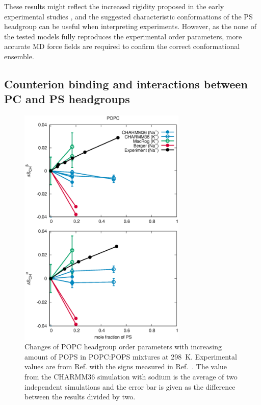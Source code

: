 \documentclass[aps,prl,superscriptaddress,twocolumn]{revtex4}
\begin{document}
These results might reflect the increased rigidity proposed in the early experimental studies \cite{browning80,buldt81}, and the suggested characteristic conformations of the PS headgroup can be useful when interpreting experiments. However, as the none of the tested models fully reproduces the experimental order parameters, more accurate MD force fields are required to confirm the correct conformational ensemble.

\subsection{Counterion binding and interactions between PC and PS headgroups}\label{ciBINDINGsection}



\begin{figure}[!tb]
  \centering
  \includegraphics[width=8.0cm]{../Figs/HGorderparametersPCvsPS.eps}
  \caption{\label{HGorderparametersPCvsPS}
    Changes of POPC headgroup order parameters with increasing amount of POPS in POPC:POPS mixtures at 298~K.
    Experimental values are from Ref.  with the signs measured in Ref.~.
    The value from the CHARMM36 simulation with sodium is the average of two independent simulations and
    the error bar is given as the difference between the results divided by two.
  }
\end{figure}
\end{document}
